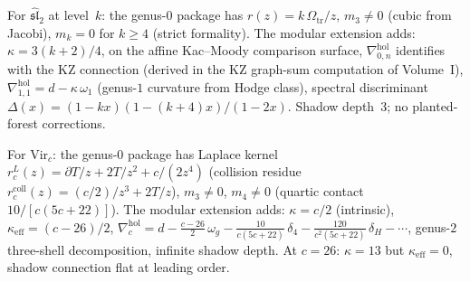 \begin{computation}
\label{comp:vol2-affine-modular-extension}
For $\widehat{\mathfrak{sl}}_2$ at level~$k$: the genus-$0$
package has $r(z)=k\,\Omega_{\mathrm{tr}}/z$, $m_3\neq 0$ (cubic from Jacobi),
$m_k=0$ for $k\ge 4$ (strict formality).
The modular extension adds:
$\kappa=3(k+2)/4$,
on the affine Kac--Moody comparison surface,
$\nabla^{\mathrm{hol}}_{0,n}$ identifies with the KZ connection
(derived in the KZ graph-sum computation of Volume~I),
$\nabla^{\mathrm{hol}}_{1,1}=d-\kappa\,\omega_1$
(genus-$1$ curvature from Hodge class),
spectral discriminant
$\Delta(x)=(1-kx)(1-(k{+}4)x)/(1-2x)$.
Shadow depth~$3$; no planted-forest corrections.
\end{computation}

\begin{computation}
\label{comp:vol2-virasoro-modular-extension}
For $\mathrm{Vir}_c$: the genus-$0$ package has
Laplace kernel $r^L_c(z)=\partial T/z+2T/z^2+c/(2z^4)$
(collision residue $r^{\mathrm{coll}}_c(z)=(c/2)/z^3+2T/z$),
$m_3\neq 0$, $m_4\neq 0$
(quartic contact $10/[c(5c+22)]$).
The modular extension adds:
$\kappa=c/2$ (intrinsic), $\kappa_{\mathrm{eff}}=(c-26)/2$,
$\nabla^{\mathrm{hol}}_c
=d-\frac{c-26}{2}\,\omega_g
-\frac{10}{c(5c+22)}\,\delta_4
-\frac{120}{c^2(5c+22)}\,\delta_H-\cdots$,
genus-$2$ three-shell decomposition, infinite shadow depth.
At $c=26$: $\kappa=13$ but $\kappa_{\mathrm{eff}}=0$, shadow
connection flat at leading order.
\end{computation}


